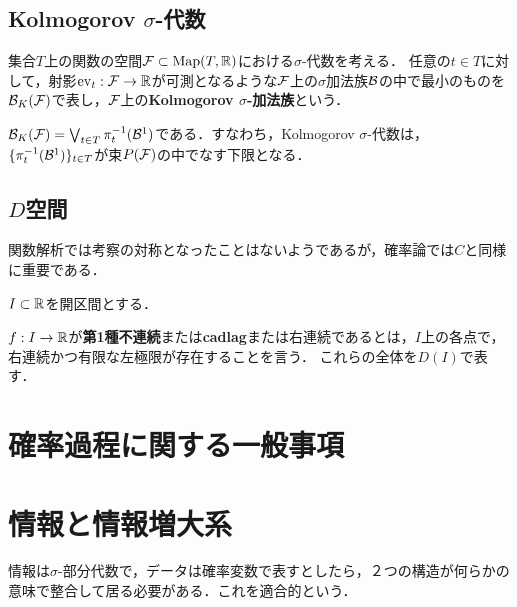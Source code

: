 \documentclass[uplatex,dvipdfmx]{jsreport}
\begin{document}
\subsection{Kolmogorov $\sigma$-代数}

\begin{definition}
    集合$T$上の関数の空間$\mathcal{F}\subset\mathrm{Map}(T,\mathbb{R})$における$\sigma$-代数を考える．
    任意の$t\in T$に対して，射影$\mathrm{ev}_t:\mathcal{F}\to\mathbb{R}$が可測となるような$\mathcal{F}$上の$\sigma$加法族$\mathcal{B}$の中で最小のものを$\mathcal{B}_K(\mathcal{F})$で表し，$\mathcal{F}$上の\textbf{Kolmogorov $\sigma$-加法族}という．
\end{definition}

\begin{lemma}
    $\mathcal{B}_K(\mathcal{F})=\bigvee_{t\in T}\pi^{-1}_t(\mathcal{B}^1)$である．すなわち，Kolmogorov $\sigma$-代数は，$\{\pi^{-1}_t(\mathcal{B}^1)\}_{t\in T}$が束$P(\mathcal{F})$の中でなす下限となる．
\end{lemma}

\subsection{$D$空間}

\begin{tcolorbox}[colframe=ForestGreen, colback=ForestGreen!10!white,breakable,colbacktitle=ForestGreen!40!white,coltitle=black,fonttitle=\bfseries\sffamily,
title=]
    関数解析では考察の対称となったことはないようであるが，確率論では$C$と同様に重要である．
\end{tcolorbox}

\begin{notation}
    $I\subset\mathbb{R}$を開区間とする．
\end{notation}

\begin{definition}
    $f:I\to\mathbb{R}$が\textbf{第1種不連続}または\textbf{cadlag}または右連続であるとは，$I$上の各点で，右連続かつ有限な左極限が存在することを言う．
    これらの全体を$D(I)$で表す．
\end{definition}

\section{確率過程に関する一般事項}

\section{情報と情報増大系}

\begin{tcolorbox}[colframe=ForestGreen, colback=ForestGreen!10!white,breakable,colbacktitle=ForestGreen!40!white,coltitle=black,fonttitle=\bfseries\sffamily,
title=]
    情報は$\sigma$-部分代数で，データは確率変数で表すとしたら，２つの構造が何らかの意味で整合して居る必要がある．これを適合的という．
\end{tcolorbox}
\end{document}

